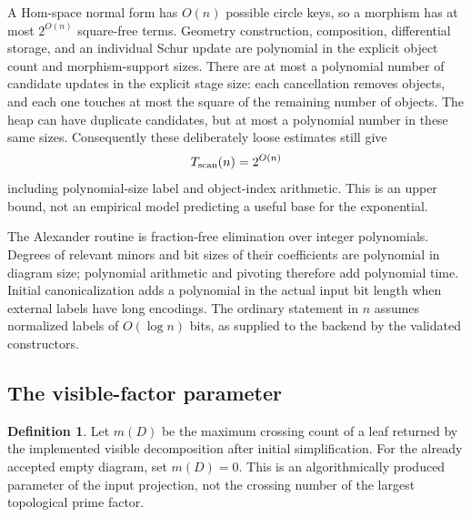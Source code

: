 \documentclass[11pt]{article}
\theoremstyle{definition}\newtheorem{definition}[theorem]{Definition}
\theoremstyle{remark}\newtheorem{remark}[theorem]{Remark}
\begin{document}
A Hom-space normal form has $O(n)$ possible circle keys, so a morphism has
at most $2^{O(n)}$ square-free terms. Geometry construction, composition,
differential storage, and an individual Schur update are polynomial in the
explicit object count and morphism-support sizes. There are at most a
polynomial number of candidate updates in the explicit stage size: each
cancellation removes objects, and each one touches at most the square of the
remaining number of objects. The heap can have duplicate candidates, but at
most a polynomial number in these same sizes. Consequently these deliberately
loose estimates still give
\begin{equation}\label{eq:exp}
 T_{\rm scan}(n)=2^{O(n)}
\end{equation}
including polynomial-size label and object-index arithmetic. This is an
upper bound, not an empirical model predicting a useful base for the
exponential.

The Alexander routine is fraction-free elimination over integer polynomials.
Degrees of relevant minors and bit sizes of their coefficients are polynomial
in diagram size; polynomial arithmetic and pivoting therefore add polynomial
time. Initial canonicalization adds a polynomial in the actual input bit
length when external labels have long encodings. The ordinary statement in
$n$ assumes normalized labels of $O(\log n)$ bits, as supplied to the backend
by the validated constructors.

\subsection{The visible-factor parameter}

\begin{definition}
Let $m(D)$ be the maximum crossing count of a leaf returned by the implemented
visible decomposition after initial simplification. For the already accepted
empty diagram, set $m(D)=0$. This is an algorithmically produced parameter of
the input projection, not the crossing number of the largest topological
prime factor.
\end{definition}
\end{document}
